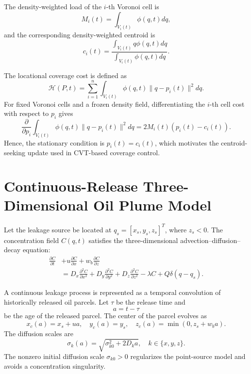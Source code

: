 \documentclass[conference]{IEEEtran}
\begin{document}
The density-weighted load of the $i$-th Voronoi cell is
\begin{equation}
M_i(t)=\int_{V_i(t)}\phi(q,t)dq,
\end{equation}
and the corresponding density-weighted centroid is
\begin{equation}
c_i(t)=
\frac{\int_{V_i(t)}q\phi(q,t)dq}
{\int_{V_i(t)}\phi(q,t)dq}.
\end{equation}

The locational coverage cost is defined as
\begin{equation}
\mathcal{H}(P,t)=
\sum_{i=1}^{n}
\int_{V_i(t)}
\phi(q,t)\|q-p_i(t)\|^2dq.
\end{equation}
For fixed Voronoi cells and a frozen density field, differentiating the $i$-th cell cost with respect to $p_i$ gives
\begin{equation}
\frac{\partial}{\partial p_i}
\int_{V_i(t)}
\phi(q,t)\|q-p_i(t)\|^2dq
=2M_i(t)(p_i(t)-c_i(t)).
\end{equation}
Hence, the stationary condition is $p_i(t)=c_i(t)$, which motivates the centroid-seeking update used in CVT-based coverage control.

\section{Continuous-Release Three-Dimensional Oil Plume Model}
Let the leakage source be located at $q_s=[x_s,y_s,z_s]^T$, where $z_s<0$. The concentration field $C(q,t)$ satisfies the three-dimensional advection--diffusion--decay equation:
\begin{equation}
\begin{aligned}
\frac{\partial C}{\partial t}
&+u\frac{\partial C}{\partial x}
+w_b\frac{\partial C}{\partial z} \\
&=
D_x\frac{\partial^2 C}{\partial x^2}
+D_y\frac{\partial^2 C}{\partial y^2}
+D_z\frac{\partial^2 C}{\partial z^2}
-\lambda C
+Q\delta(q-q_s).
\end{aligned}
\end{equation}

A continuous leakage process is represented as a temporal convolution of historically released oil parcels. Let $\tau$ be the release time and
\begin{equation}
a=t-\tau
\end{equation}
be the age of the released parcel. The center of the parcel evolves as
\begin{equation}
x_c(a)=x_s+ua,\quad y_c(a)=y_s,\quad z_c(a)=\min(0,z_s+w_ba).
\end{equation}
The diffusion scales are
\begin{equation}
\sigma_k(a)=\sqrt{\sigma_{k0}^2+2D_ka},\quad k\in\{x,y,z\}.
\end{equation}
The nonzero initial diffusion scale $\sigma_{k0}>0$ regularizes the point-source model and avoids a concentration singularity.
\end{document}
